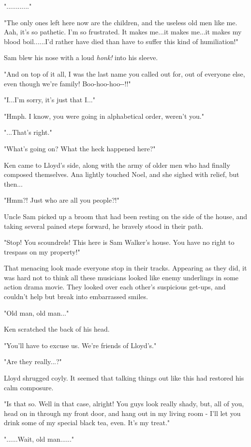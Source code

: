 \documentclass[
]{article}
\begin{document}
"............"

"The only ones left here now are the children, and the useless old men
like me. Aah, it's so pathetic. I'm so frustrated. It makes me...it
makes me...it makes my blood boil......I'd rather have died than have to
suffer this kind of humiliation!"

Sam blew his nose with a loud \emph{honk!} into his sleeve.

"And on top of it all, I was the last name you called out for, out of
everyone else, even though we're family! Boo-hoo-hoo-\/-!!"

"I...I'm sorry, it's just that I..."

"Hmph. I know, you were going in alphabetical order, weren't you."

"...That's right."

"What's going on? What the heck happened here?"

Ken came to Lloyd's side, along with the army of older men who had
finally composed themselves. Ana lightly touched Noel, and she sighed
with relief, but then...

"Hmm?! Just who are all you people?!"

Uncle Sam picked up a broom that had been resting on the side of the
house, and taking several pained steps forward, he bravely stood in
their path.

"Stop! You scoundrels! This here is Sam Walker's house. You have no
right to trespass on my property!"

That menacing look made everyone stop in their tracks. Appearing as they
did, it was hard not to think all these musicians looked like enemy
underlings in some action drama movie. They looked over each other's
suspicious get-ups, and couldn't help but break into embarrassed smiles.

"Old man, old man..."

Ken scratched the back of his head.

"You'll have to excuse us. We're friends of Lloyd's."

"Are they really...?"

Lloyd shrugged coyly. It seemed that talking things out like this had
restored his calm composure.

"Is that so. Well in that case, alright! You guys look really shady,
but, all of you, head on in through my front door, and hang out in my
living room - I'll let you drink some of my special black tea, even.
It's my treat."

"......Wait, old man......"
\end{document}
